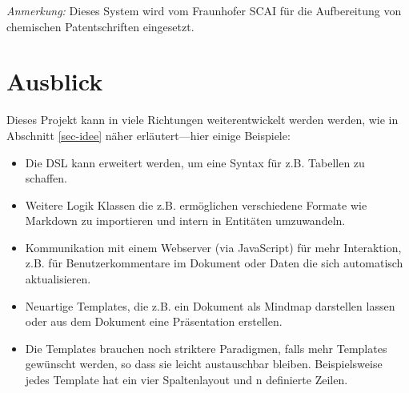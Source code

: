 \erreichtDSL

\emph{Anmerkung:}
Dieses System wird vom Fraunhofer SCAI für die Aufbereitung von
chemischen Patentschriften eingesetzt.


\section{Ausblick}

Dieses Projekt kann in viele Richtungen weiterentwickelt werden werden,
wie in Abschnitt \ref{sec-idee} näher erläutert---hier einige Beispiele:

\begin{itemize}
  \item Die DSL kann erweitert werden,
        um eine Syntax für z.B. Tabellen zu schaffen.
  \item Weitere Logik Klassen die z.B. ermöglichen verschiedene Formate wie
        Markdown zu importieren und intern in Entitäten umzuwandeln.
  \item Kommunikation mit einem Webserver (via JavaScript) für mehr Interaktion,
        z.B. für Benutzerkommentare im Dokument oder Daten die sich automatisch
        aktualisieren.
  \item Neuartige Templates, die z.B. ein Dokument als Mindmap
        darstellen lassen oder aus dem Dokument eine Präsentation erstellen.
  \item Die Templates brauchen noch striktere Paradigmen, falls mehr
        Templates gewünscht werden, so dass sie leicht austauschbar bleiben.
        Beispielsweise jedes Template hat ein vier Spaltenlayout und n definierte
        Zeilen.
\end{itemize}